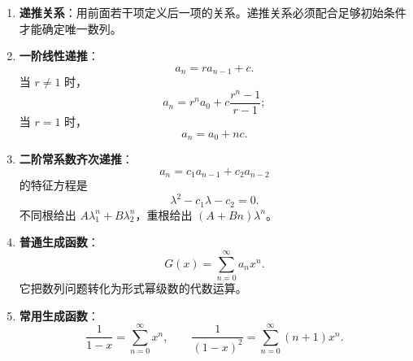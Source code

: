 \begin{enumerate}
	\item \textbf{递推关系}：用前面若干项定义后一项的关系。递推关系必须配合足够初始条件才能确定唯一数列。
	\item \textbf{一阶线性递推}：
	\[
	a_n=ra_{n-1}+c.
	\]
	当 \(r\ne1\) 时，
	\[
	a_n=r^na_0+c\frac{r^n-1}{r-1};
	\]
	当 \(r=1\) 时，
	\[
	a_n=a_0+nc.
	\]
	\item \textbf{二阶常系数齐次递推}：
	\[
	a_n=c_1a_{n-1}+c_2a_{n-2}
	\]
	的特征方程是
	\[
	\lambda^2-c_1\lambda-c_2=0.
	\]
	不同根给出 \(A\lambda_1^n+B\lambda_2^n\)，重根给出 \((A+Bn)\lambda^n\)。
	\item \textbf{普通生成函数}：
	\[
	G(x)=\sum_{n=0}^{\infty}a_nx^n.
	\]
	它把数列问题转化为形式幂级数的代数运算。
	\item \textbf{常用生成函数}：
	\[
	\frac1{1-x}=\sum_{n=0}^{\infty}x^n,\qquad
	\frac1{(1-x)^2}=\sum_{n=0}^{\infty}(n+1)x^n.
	\]
\end{enumerate}
